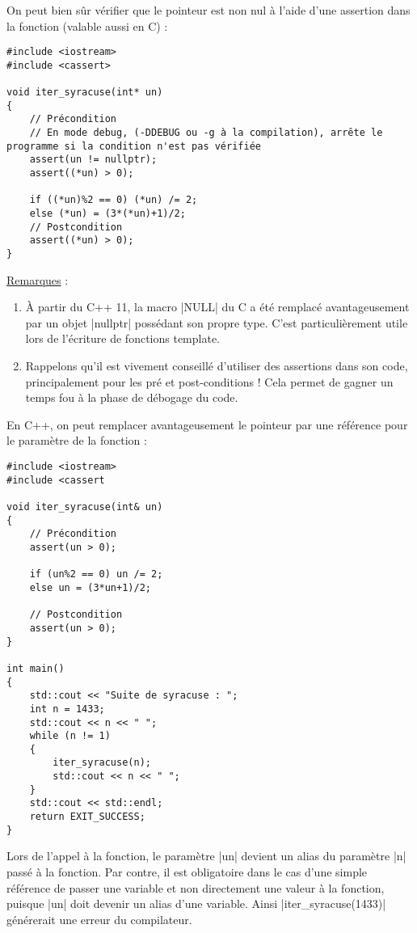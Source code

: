 On peut bien sûr vérifier que le pointeur est non nul à l'aide d'une assertion dans la fonction (valable aussi en C) :
\begin{lstlisting}[caption=fonction C avec modification des arguments d'entrée]
#include <iostream>
#include <cassert>

void iter_syracuse(int* un)
{
    // Précondition
    // En mode debug, (-DDEBUG ou -g à la compilation), arrête le programme si la condition n'est pas vérifiée
    assert(un != nullptr); 
    assert((*un) > 0);

    if ((*un)%2 == 0) (*un) /= 2;
    else (*un) = (3*(*un)+1)/2;
    // Postcondition
    assert((*un) > 0);
}
\end{lstlisting}

\underline{Remarques} : 
\begin{enumerate}
    \item À partir du C++ 11, la macro |NULL| du C a été remplacé avantageusement par un objet |nullptr| possédant son propre type. C'est particulièrement utile lors de l'écriture de fonctions template.
    \item Rappelons qu'il est vivement conseillé d'utiliser des assertions dans son code, principalement pour les pré et post-conditions ! Cela permet de gagner un temps fou à la phase de débogage du code. 
\end{enumerate}

En C++, on peut remplacer avantageusement le pointeur par une référence pour le paramètre de la fonction :
\begin{lstlisting}[caption=fonction C avec modification des arguments d'entrée]
#include <iostream>
#include <cassert

void iter_syracuse(int& un)
{
    // Précondition
    assert(un > 0);

    if (un%2 == 0) un /= 2;
    else un = (3*un+1)/2;

    // Postcondition
    assert(un > 0);
}

int main()
{
    std::cout << "Suite de syracuse : ";
    int n = 1433;
    std::cout << n << " ";
    while (n != 1)
    {
        iter_syracuse(n);
        std::cout << n << " ";
    }
    std::cout << std::endl;
    return EXIT_SUCCESS;
}
\end{lstlisting}

Lors de l'appel à la fonction, le paramètre |un| devient un alias du paramètre |n| passé à la fonction. Par contre, il est obligatoire dans le cas d'une simple référence de passer une variable et non directement une valeur à la fonction, puisque
|un| doit devenir un alias d'une variable. Ainsi |iter_syracuse(1433)| générerait une erreur du compilateur.

